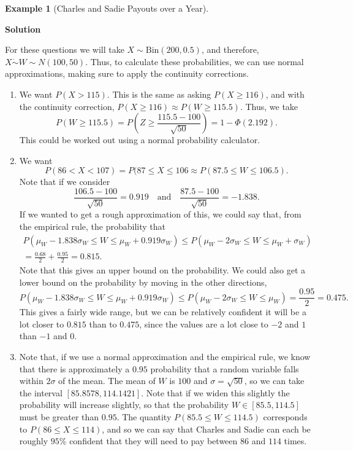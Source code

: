 \documentclass[
  letterpaper,
  DIV=11,
  numbers=noendperiod]{scrreprt}
\providecommand{\tightlist}{%
  \setlength{\itemsep}{0pt}\setlength{\parskip}{0pt}}\usepackage{longtable,booktabs,array}
\theoremstyle{definition}
\theoremstyle{definition}
\newtheorem{example}{Example}[chapter]
\theoremstyle{definition}
\theoremstyle{remark}
\begin{document}
\begin{example}[Charles and Sadie Payouts over a
Year]
\begin{tcolorbox}[enhanced jigsaw, colback=white, colframe=quarto-callout-color-frame, arc=.35mm, leftrule=.75mm, rightrule=.15mm, opacityback=0, breakable, bottomrule=.15mm, left=2mm, toprule=.15mm]
\vspace{-3mm}\textbf{Solution}\vspace{3mm}

For these questions we will take \(X \sim \text{Bin}(200, 0.5)\), and
therefore, \(X \dot\sim W \sim N(100, 50)\). Thus, to calculate these
probabilities, we can use normal approximations, making sure to apply
the continuity corrections.

\begin{enumerate}
\def\labelenumi{\alph{enumi}.}
\tightlist
\item
  We want \(P(X > 115)\). This is the same as asking \(P(X \geq 116)\),
  and with the continuity correction,
  \(P(X \geq 116) \approx P(W \geq 115.5)\). Thus, we take
  \[P(W \geq 115.5) = P\left(Z \geq \frac{115.5 - 100}{\sqrt{50}}\right) = 1 - \Phi\left(2.192\right).\]
  This could be worked out using a normal probability
  calculator.\footnotemark{}
\item
  We want
  \[P(86 < X < 107) = P(87 \leq X \leq 106 \approx P(87.5 \leq W \leq 106.5).\]
  Note that if we consider
  \[\frac{106.5 - 100}{\sqrt{50}} = 0.919 \quad\text{and}\quad \frac{87.5 - 100}{\sqrt{50}} = -1.838.\]
  If we wanted to get a rough approximation of this, we could say that,
  from the empirical rule, the probability that
  \begin{multline*}P(\mu_W - 1.838\sigma_W \leq W \leq \mu_W + 0.919\sigma_W) \leq P(\mu_W - 2\sigma_W \leq W \leq \mu_W + \sigma_W) \\
  = \frac{0.68}{2} + \frac{0.95}{2} = 0.815.\end{multline*} Note that
  this gives an upper bound on the probability. We could also get a
  lower bound on the probability by moving in the other directions,
  \[P(\mu_W - 1.838\sigma_W \leq W \leq \mu_W + 0.919\sigma_W) \leq P(\mu_W - 2\sigma_W \leq W \leq \mu_W) = \frac{0.95}{2} = 0.475.\]
  This gives a fairly wide range, but we can be relatively confident it
  will be a lot closer to \(0.815\) than to \(0.475\), since the values
  are a lot close to \(-2\) and \(1\) than \(-1\) and
  \(0\).\footnotemark{}
\item
  Note that, if we use a normal approximation and the empirical rule, we
  know that there is approximately a \(0.95\) probability that a random
  variable falls within \(2\sigma\) of the mean. The mean of \(W\) is
  \(100\) and \(\sigma = \sqrt{50}\), so we can take the interval
  \([85.8578, 114.1421]\). Note that if we widen this slightly the
  probability will increase slightly, so that the probability
  \(W \in [85.5, 114.5]\) must be greater than \(0.95\). The quantity
  \(P(85.5 \leq W \leq 114.5)\) corresponds to
  \(P(86 \leq X \leq 114)\), and so we can say that Charles and Sadie
  can each be roughly \(95\%\) confident that they will need to pay
  between \(86\) and \(114\) times.\footnotemark{}
\end{enumerate}


\end{tcolorbox}
\end{example}
\end{document}
